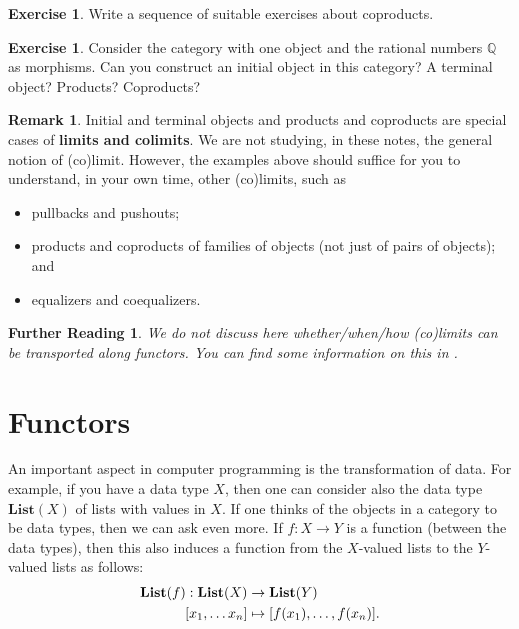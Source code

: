 \documentclass[a4paper,10pt]{scrartcl}
\theoremstyle{plain}
\newtheorem*{reading*}{Further Reading}
\theoremstyle{definition}
\newtheorem{rem}[thm]{Remark}
\newtheorem{exer}[thm]{Exercise}
\newcommand{\Catb}[1]{\mathbf{#1}}
\newcommand{\List}{\Catb{List}}
\begin{document}
\begin{exer}
  Write a sequence of suitable exercises about coproducts.
\end{exer}

\begin{exer}
  Consider the category with one object and the rational numbers $\mathbb{Q}$ as morphisms.
  Can you construct an initial object in this category? A terminal object? Products? Coproducts?
\end{exer}

\begin{rem}
  Initial and terminal objects and products and coproducts are special cases of \textbf{limits and colimits}.
  We are not studying, in these notes, the general notion of (co)limit.
  However, the examples above should suffice for you to understand, in your own time, other (co)limits, such as
  \begin{itemize}
  \item pullbacks and pushouts;
  \item products and coproducts of families of objects (not just of pairs of objects); and
  \item equalizers and coequalizers.
  \end{itemize}
\end{rem}

\begin{reading*}
  We do not discuss here whether/when/how (co)limits can be transported along functors.
  You can find some information on this in \cite[\S 5.3]{leinster}.
\end{reading*}


\section{Functors}\label{sec:functors}
An important aspect in computer programming is the transformation of data. For example, if you have a data type $X$, then one can consider also the data type $\List(X)$ of lists with values in $X$. If one thinks of the objects in a category to be data types, then we can ask even more. If $f:X\to Y$ is a function (between the data types), then this also induces  a function from the $X$-valued lists to the $Y$-valued lists as follows:
\begin{align}\label{eqn:function_on_list}
  \List(f) : \List(X)&\to \List(Y)
  \\
  [x_1,\ldots x_n] &\mapsto [f(x_1),\ldots,f(x_n)]. \notag
\end{align}
\end{document}
